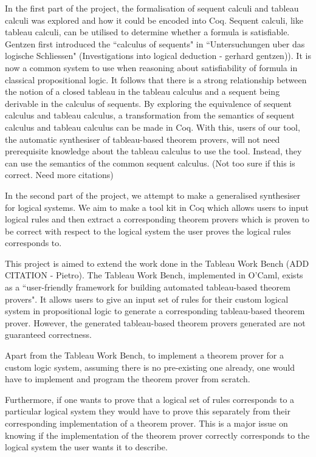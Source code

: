 In the first part of the project, the formalisation of sequent calculi and
tableau calculi was explored and how it could be encoded into Coq. Sequent
calculi, like tableau calculi, can be utilised to determine whether a formula
is satisfiable. Gentzen first introduced the ``calculus of sequents" in
``Untersuchungen uber das logische Schliessen" (Investigations into logical
deduction - gerhard gentzen)). It is now a common system to use when reasoning
about satisfiability of formula in classical propositional logic. It follows
that there is a strong relationship between the notion of a closed tableau in
the tableau calculus and a sequent being derivable in the calculus of sequents.
By exploring the equivalence of sequent calculus and tableau calculus, a
transformation from the semantics of sequent calculus and tableau calculus can
be made in Coq. With this, users of our tool, the automatic synthesiser of
tableau-based theorem provers, will not need prerequisite knowledge about the
tableau calculus to use the tool. Instead, they can use the semantics of the
common sequent calculus.
(Not too sure if this is correct. Need more citations)

In the second part of the project, we attempt to make a generalised synthesiser
for logical systems. We aim to make a tool kit in Coq which allows users to
input logical rules and then extract a corresponding theorem provers which is
proven to be correct with respect to the logical system the user proves the
logical rules corresponds to.

This project is aimed to extend the work done in the Tableau Work Bench
(ADD CITATION - Pietro). The Tableau Work Bench, implemented in O'Caml, exists
as a ``user-friendly framework for building automated tableau-based theorem
provers". It allows users to give an input set of rules for their custom
logical system in propositional logic to generate a corresponding tableau-based
theorem prover. However, the generated tableau-based theorem provers generated
are not guaranteed correctness.

Apart from the Tableau Work Bench, to implement a theorem prover for a custom
logic system, assuming there is no pre-existing one already, one would have to
implement and program the theorem prover from scratch.

Furthermore, if one wants to prove that a logical set of rules corresponds to
a particular logical system they would have to prove this separately from their
corresponding implementation of a theorem prover. This is a major issue on
knowing if the implementation of the theorem prover correctly corresponds to
the logical system the user wants it to describe.

